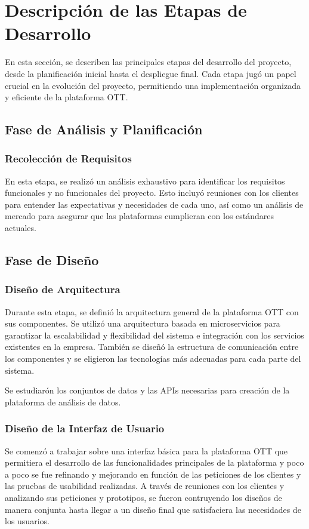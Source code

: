 \section{Descripción de las Etapas de Desarrollo}
En esta sección, se describen las principales etapas del desarrollo del proyecto, 
desde la planificación inicial hasta el despliegue final. Cada etapa jugó un papel 
crucial en la evolución del proyecto, permitiendo una implementación organizada y eficiente de la plataforma OTT.

\subsection{Fase de Análisis y Planificación}
\subsubsection{Recolección de Requisitos}
En esta etapa, se realizó un análisis exhaustivo para identificar los requisitos 
funcionales y no funcionales del proyecto. Esto incluyó reuniones con los clientes
para entender las expectativas y necesidades de cada uno, así como un análisis de mercado para
asegurar que las plataformas cumplieran con los estándares actuales. 

\subsection{Fase de Diseño}
\subsubsection{Diseño de Arquitectura}
Durante esta etapa, se definió la arquitectura general de la plataforma  OTT con sus componentes. Se utilizó 
una arquitectura basada en microservicios para garantizar la escalabilidad y flexibilidad del 
sistema e integración con los servicios existentes en la empresa. También se diseñó la estructura de 
comunicación entre los componentes y se eligieron las tecnologías más adecuadas para cada parte del sistema.

Se estudiarón los conjuntos de datos y las APIs necesarias para creación de la plataforma de análisis de datos.

\subsubsection{Diseño de la Interfaz de Usuario}
Se comenzó a trabajar sobre una interfaz básica para la plataforma OTT que permitiera el desarrollo de las funcionalidades
principales de la plataforma y poco a poco se fue refinando y mejorando en función de las peticiones
de los clientes y las pruebas de usabilidad realizadas. A través de reuniones con los clientes y 
analizando sus peticiones y prototipos, se fueron contruyendo los diseños de manera conjunta hasta
llegar a un diseño final que satisfaciera las necesidades de los usuarios.

